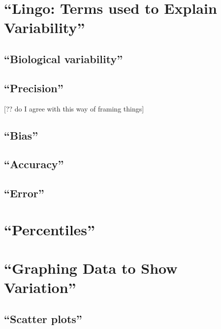 \documentclass[]{book}
\theoremstyle{definition}
\theoremstyle{definition}
\theoremstyle{definition}
\theoremstyle{remark}
\begin{document}
\section{\texorpdfstring{``Lingo: Terms used to Explain
Variability''}{Lingo: Terms used to Explain Variability}}\label{lingo-terms-used-to-explain-variability}

\subsection{\texorpdfstring{``Biological
variability''}{Biological variability}}\label{biological-variability}

\subsection{\texorpdfstring{``Precision''}{Precision}}\label{precision}

{[}?? do I agree with this way of framing things{]}

\subsection{\texorpdfstring{``Bias''}{Bias}}\label{bias}

\subsection{\texorpdfstring{``Accuracy''}{Accuracy}}\label{accuracy}

\subsection{\texorpdfstring{``Error''}{Error}}\label{error}

\section{\texorpdfstring{``Percentiles''}{Percentiles}}\label{percentiles}

\section{\texorpdfstring{``Graphing Data to Show
Variation''}{Graphing Data to Show Variation}}\label{graphing-data-to-show-variation}

\subsection{\texorpdfstring{``Scatter
plots''}{Scatter plots}}\label{scatter-plots}
\end{document}
